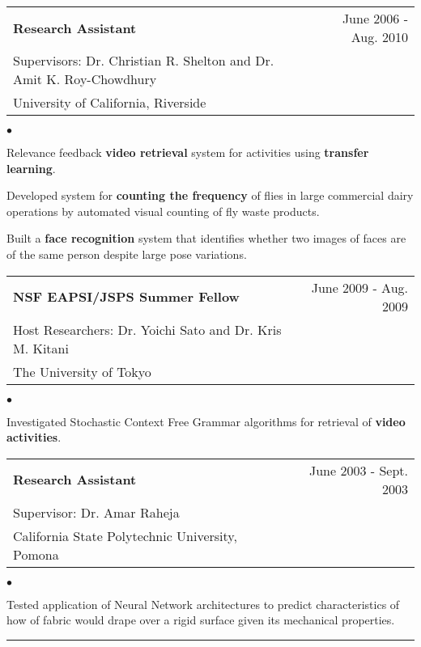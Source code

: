 \documentclass[letterpaper,10pt]{article}
\newcommand{\myline}{ \rule{\textwidth}{0.01in} }
\newenvironment{smallitemize}{
  \begin{list}{$\bullet$}{
    \setlength{\leftmargin}{3.5em}
        \setlength{\topmargin}{-1.0em}
    \setlength{\itemsep}{-0.10em}
    \setlength{\parskip}{-0.8em}
    \setlength{\parsep}{0.10em}
  }
}{
  \end{list}
}
\renewcommand{\bf}{\bfseries}
\begin{document}
\begin{tabularx}{\textwidth}{b{}r}
        \bf{Research Assistant} & June 2006 - Aug. 2010 {} \\
        Supervisors: Dr. Christian R. Shelton and Dr. Amit K. Roy-Chowdhury & {} \\
        {University of California, Riverside} &\\
\end{tabularx}
\begin{smallitemize} \normalfont
        \item Relevance feedback \textbf{video retrieval} system for activities using \textbf{transfer learning}.
        \item Developed system for \textbf{counting the frequency} of flies in large commercial dairy operations by automated visual counting of fly waste products.
        \item Built a \textbf{face recognition} system that identifies whether two images of faces are of the same person despite large pose variations.
\end{smallitemize}

\begin{tabularx}{\textwidth}{b{}r}
        \bf{NSF EAPSI/JSPS Summer Fellow} & June 2009 - Aug. 2009 \\
        Host Researchers: Dr. Yoichi Sato and Dr. Kris M. Kitani & {} \\
        {The University of Tokyo} &\\
\end{tabularx}
\begin{smallitemize} \normalfont
        \item Investigated Stochastic Context Free Grammar algorithms for retrieval of \textbf{video activities}.
\end{smallitemize}
\pagebreak
\begin{tabularx}{\textwidth}{b{}r}
        \bf{Research Assistant} & June 2003 - Sept. 2003 \\
        Supervisor: Dr. Amar Raheja & {} \\
        {California State Polytechnic University, Pomona} &\\
\end{tabularx}
\begin{smallitemize} \normalfont
        \item Tested application of Neural Network architectures to predict characteristics of how of fabric would drape over a rigid surface given its mechanical properties.
\end{smallitemize}
\myline
\end{document}
